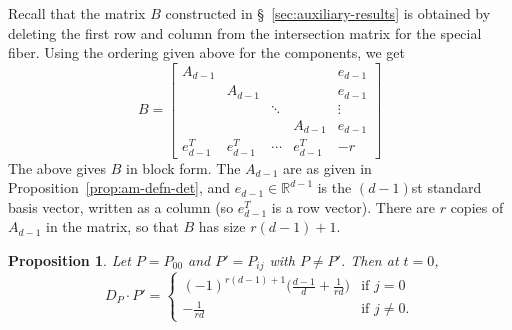 \documentclass[reqno]{amsart}
\newtheorem{proposition}[thm]{Proposition}
\theoremstyle{definition}
\theoremstyle{remark}
\def\R{\mathbb{R}}
\begin{document}
Recall that the matrix $B$ constructed in \S~\ref{sec:auxiliary-results} is obtained by deleting the first row and column from the intersection matrix for the special fiber. Using the ordering given above for the components, we get
\[
B =
\left[\begin{array}{ccccc}
  A_{d-1} & & & & e_{d-1} \\
  & A_{d-1} & & & e_{d-1} \\
  & & \ddots & & \vdots \\
  & & & A_{d-1} & e_{d-1} \\
  e_{d-1}^T & e_{d-1}^T & \cdots & e_{d-1}^T & -r
\end{array}\right]
\]
The above gives $B$ in block form. The $A_{d-1}$ are as given in Proposition~\ref{prop:am-defn-det}, and $e_{d-1} \in \R^{d-1}$ is the $(d-1)$st standard basis vector, written as a column (so $e_{d-1}^T$ is a row vector). There are $r$ copies of $A_{d-1}$ in the matrix, so that $B$ has size $r(d-1) + 1$.

\begin{proposition}\label{prop:dp-u-zero}
  Let $P = P_{00}$ and $P' = P_{ij}$ with $P \neq P'$. Then at $t = 0$,
\[
D_P \cdot P' =
\begin{cases}
  (-1)^{r(d-1)+1}\bigg(\frac{d-1}{d} + \frac{1}{rd}\bigg) & \text{if } j = 0 \\
  -\frac{1}{rd} & \text{if } j \neq 0.
\end{cases}
\]
\end{proposition}
\end{document}
